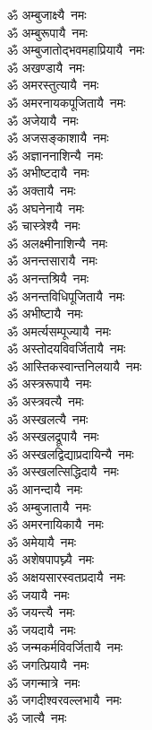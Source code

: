 \begin{flushleft}
\begin{multicols}{2}
ॐ अम्बुजाक्ष्यै~नमः\\
ॐ अम्बुरूपायै~नमः\\
ॐ अम्बुजातोद्भवमहाप्रियायै~नमः\\
ॐ अखण्डायै~नमः\\
ॐ अमरस्तुत्यायै~नमः\\
ॐ अमरनायकपूजितायै~नमः\\
ॐ अजेयायै~नमः\hfill{}\\
ॐ अजसङ्काशायै~नमः\\
ॐ अज्ञाननाशिन्यै~नमः\\
ॐ अभीष्टदायै~नमः\\
ॐ अक्तायै~नमः\\
ॐ अघनेनायै~नमः\\
ॐ चास्त्रेश्यै~नमः\\
ॐ अलक्ष्मीनाशिन्यै~नमः\\
ॐ अनन्तसारायै~नमः\\
ॐ अनन्तश्रियै~नमः\\
ॐ अनन्तविधिपूजितायै~नमः\hfill{}\\
ॐ अभीष्टायै~नमः\\
ॐ अमर्त्यसम्पूज्यायै~नमः\\
ॐ अस्तोदयविवर्जितायै~नमः\\
ॐ आस्तिकस्वान्तनिलयायै~नमः\\
ॐ अस्त्ररूपायै~नमः\\
ॐ अस्त्रवत्यै~नमः\\
ॐ अस्खलत्यै~नमः\\
ॐ अस्खलद्रूपायै~नमः\\
ॐ अस्खलद्विद्याप्रदायिन्यै~नमः\\
ॐ अस्खलत्सिद्धिदायै~नमः\hfill{}\\
ॐ आनन्दायै~नमः\\
ॐ अम्बुजातायै~नमः\\
ॐ अमरनायिकायै~नमः\\
ॐ अमेयायै~नमः\\
ॐ अशेषपापघ्न्यै~नमः\\
ॐ अक्षयसारस्वतप्रदायै~नमः\\
ॐ जयायै~नमः\\
ॐ जयन्त्यै~नमः\\
ॐ जयदायै~नमः\\
ॐ जन्मकर्मविवर्जितायै~नमः\hfill{}\\
ॐ जगत्प्रियायै~नमः\\
ॐ जगन्मात्रे~नमः\\
ॐ जगदीश्वरवल्लभायै~नमः\\
ॐ जात्यै~नमः\\

\end{multicols}
\end{flushleft}
